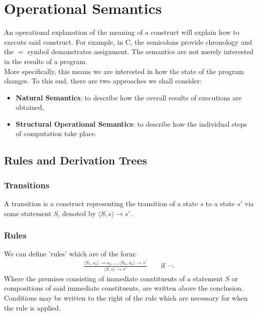\section{Operational Semantics}

An operational explanation of the meaning of a construct will explain
how to execute said construct. For example, in C, the semicolons provide
chronology and the $=$ symbol demonstrates assignment. The semantics
are not merely interested in the results of a program.
\\[\baselineskip]
More specifically, this means we are interested in how the state of the
program changes. To this end, there are two approaches we shall consider:
\begin{itemize}
  \item \textbf{Natural Semantics}: to describe how the overall
  results of executions are obtained,
  \item \textbf{Structural Operational Semantics}: to describe how
  the individual steps of computation take place.
\end{itemize}

\subsection{Rules and Derivation Trees}

\subsubsection{Transitions}

A transition is a construct representing the transition of
a state $s$ to a state $s'$ via some statement $S$, denoted
by $\langle S, s \rangle \to s'$.

\subsubsection{Rules}

We can define 'rules' which are of the form: \begin{gather*}
  \frac{
    \langle S_1, s_1 \rangle \to s_2, \ldots, \langle S_n, s_n \rangle \to s'
  }{
    \langle S, s \rangle \to s'
  } \qquad \text{if } \cdots.
\end{gather*} Where the premises consisting of immediate constituents 
of a statement $S$ or compositions of said immediate constituents, 
are written above the conclusion. Conditions may be written to the right
of the rule which are necessary for when the rule is applied.

